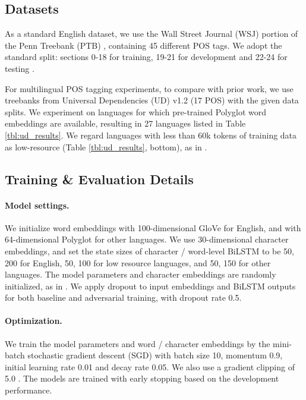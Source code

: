 \documentclass[11pt,a4paper]{article}
\begin{document}
\subsection{Datasets}
As a standard English dataset, we use the Wall Street Journal (WSJ) portion of the Penn Treebank (PTB) \cite{Marcus:1993:BLA:972470.972475}, containing 45 different POS tags.
We adopt the standard split: sections 0-18 for training, 19-21 for development and 22-24 for testing \cite{Collins2002,Manning:2011:from97to100}.


For multilingual POS tagging experiments,
to compare with prior work,
we use treebanks from Universal Dependencies (UD) v1.2 \cite{11234/1-1548} (17 POS) with the given data splits.
We experiment on languages for which pre-trained Polyglot word embeddings \cite{polyglot:2013:ACL-CoNLL} are available, resulting in 27 languages listed in Table \ref{tbl:ud_results}.
We regard languages with less than 60k tokens of training data as low-resource (Table \ref{tbl:ud_results}, bottom), as in .

\subsection{Training \& Evaluation Details}

\paragraph{Model settings.}

We initialize word embeddings with 100-dimensional GloVe \cite{pennington-socher-manning:2014:EMNLP2014} for English, and with 64-dimensional Polyglot \cite{polyglot:2013:ACL-CoNLL} for other languages.
We use 30-dimensional character embeddings, and set the state sizes of character \!/\! word-level BiLSTM to be 50, 200  for English, 50, 100 for low resource languages, and 50, 150 for other languages. The model parameters and character embeddings are randomly initialized, 
as in
.
We apply dropout \cite{JMLR:v15:srivastava14a} to input embeddings and BiLSTM outputs for both baseline and adversarial training, with dropout rate 0.5.


\paragraph{Optimization.}
We train the model parameters and word \!/\! character embeddings by the mini-batch stochastic gradient descent (SGD) with batch size 10, momentum 0.9, initial learning rate 0.01 and decay rate 0.05. 
We also use a gradient clipping of 5.0 \cite{Pascanu2012}.
The models are trained with
early stopping \cite{caruana2001overfitting} based on the development performance.
\end{document}
